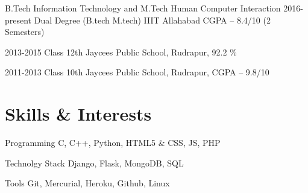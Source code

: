 \documentclass{tccv}
\begin{document}
\begin{yearlist}

\item[B.Tech Information Technology and M.Tech Human Computer Interaction]{2016-present}
     {Dual Degree (B.tech M.tech)}
     {\large{IIIT Allahabad} \newline CGPA -- 8.4/10 (2 Semesters)}

\item{2013-2015}
     {Class 12th}
     {Jaycees Public School, Rudrapur, 92.2 \%}

\item{2011-2013}
     {Class 10th}
     {Jaycees Public School, Rudrapur, CGPA -- 9.8/10}

\end{yearlist}








\section{Skills \& Interests}

\begin{factlist}

\item{Programming}
     {C, C++, Python, HTML5 \& CSS, JS, PHP}

\item{Technolgy Stack}
	{Django, Flask, MongoDB, SQL}

\item{Tools}
     {Git, Mercurial, Heroku, Github, Linux}
     
     
\end{factlist}




\end{document}
